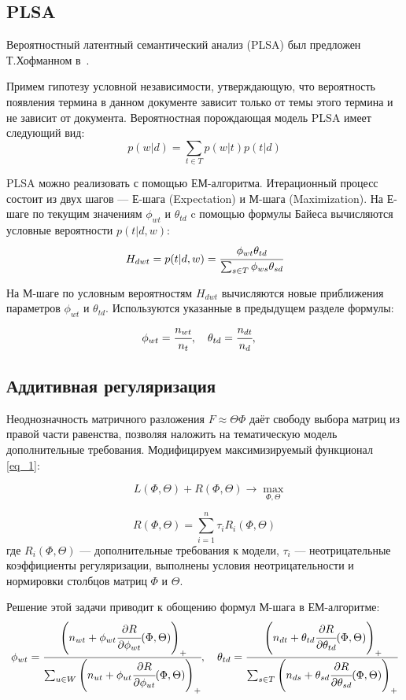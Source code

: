 
\subsection{PLSA}

Вероятностный латентный семантический анализ (PLSA) был предложен Т.Хофманном в~\cite{hofmann_plsa}.

Примем гипотезу условной независимости, утверждающую, что вероятность появления термина в данном документе зависит только от темы этого термина и не зависит от документа. Вероятностная порождающая модель PLSA имеет следующий вид: 
\[
	p(w|d) = \sum_{t \in T} p(w|t) p(t|d)
\]

PLSA можно реализовать с помощью ЕМ-алгоритма. Итерационный процесс состоит из двух шагов --- Е-шага (Expectation) и М-шага (Maximization). На Е-шаге по текущим значениям $\phi_{wt}$ и $\theta_{td}$ c помощью формулы Байеса вычисляются условные вероятности $p(t|d,w)$:
\[
	H_{dwt} = p(t|d,w) = \cfrac{\phi_{wt}\theta_{td}}{\sum_{s \in T}\phi_{ws}\theta_{sd}}
\]

На М-шаге по условным вероятностям $H_{dwt}$ вычисляются новые приближения параметров $\phi_{wt}$ и $\theta_{td}$. Используются указанные в предыдущем разделе формулы:
\[
	\phi_{wt} = \cfrac{n_{wt}}{n_t}, \quad
	\theta_{td} = \cfrac{n_{dt}}{n_d}, \quad	
\]

\subsection{Аддитивная регуляризация}

Неоднозначность матричного разложения $F \approx \Theta \Phi$ даёт свободу выбора матриц из правой части равенства, позволяя наложить на тематическую модель дополнительные требования.  
Модифицируем максимизируемый функционал \ref{eq_1}:

\begin{equation}
	\quad L(\Phi,\Theta) + R(\Phi,\Theta) \rightarrow \max_{\Phi,\Theta}
\end{equation}	


\[
 	R(\Phi,\Theta) = \sum_{i = 1}^{n} \tau_i R_i(\Phi,\Theta)
\]	
где $R_i(\Phi,\Theta)$ --- дополнительные требования к модели, $\tau_i$ --- неотрицательные  коэффициенты регуляризации, выполнены условия неотрицательности и нормировки столбцов матриц $\Phi$ и $\Theta$.
 	 
Решение этой задачи приводит к обощению формул М-шага в ЕМ-алгоритме:
\begin{equation}
	\phi_{wt} = \cfrac{\left(n_{wt} + \phi_{wt} \cfrac{\partial R}{\partial \phi_{wt}} (\Phi,\Theta) \right)_+}{\sum_{u \in W} \left(n_{ut} + \phi_{ut} \cfrac{\partial R}{\partial \phi_{ut}} (\Phi,\Theta) \right)_+}, \quad 
 	\theta_{td} = \cfrac{\left(n_{dt} + \theta_{td} \cfrac{\partial R}{\partial \theta_{td}} (\Phi,\Theta) \right)_+}{\sum_{s \in T} \left(n_{ds} + \theta_{sd} \cfrac{\partial R}{\partial \theta_{sd}} (\Phi,\Theta) \right)_+}
\end{equation} 
 	 
